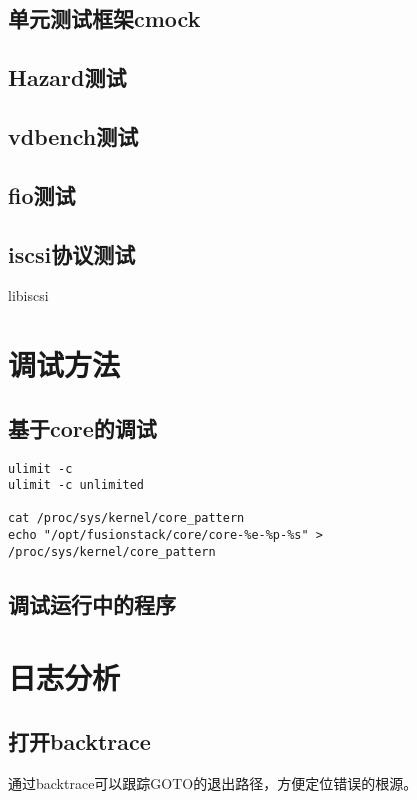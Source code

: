 \subsection{单元测试框架cmock}

\subsection{Hazard测试}
\subsection{vdbench测试}
\subsection{fio测试}
\subsection{iscsi协议测试}

libiscsi

\section{调试方法}

\subsection{基于core的调试}

\begin{lstlisting}
ulimit -c
ulimit -c unlimited

cat /proc/sys/kernel/core_pattern
echo "/opt/fusionstack/core/core-%e-%p-%s" > /proc/sys/kernel/core_pattern
\end{lstlisting}

\subsection{调试运行中的程序}

\section{日志分析}

\subsection{打开backtrace}

通过backtrace可以跟踪GOTO的退出路径，方便定位错误的根源。

